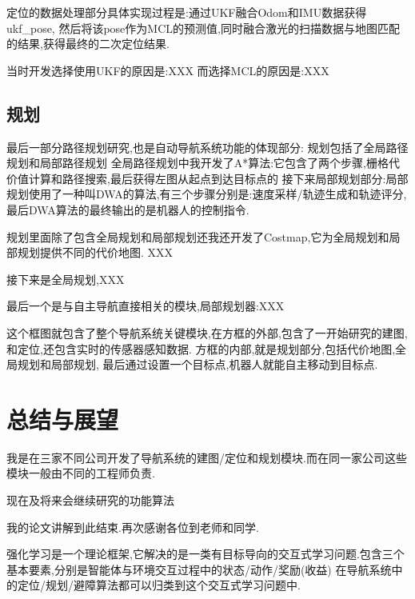 定位的数据处理部分具体实现过程是:通过UKF融合Odom和IMU数据获得ukf\_pose,
然后将该pose作为MCL的预测值,同时融合激光的扫描数据与地图匹配的结果,获得最终的二次定位结果.

当时开发选择使用UKF的原因是:XXX \qquad
而选择MCL的原因是:XXX

\subsection{规划}

最后一部分路径规划研究,也是自动导航系统功能的体现部分:
规划包括了全局路径规划和局部路径规划
全局路径规划中我开发了A*算法:它包含了两个步骤,栅格代价值计算和路径搜索,最后获得左图从起点到达目标点的
接下来局部规划部分:局部规划使用了一种叫DWA的算法,有三个步骤分别是:速度采样/轨迹生成和轨迹评分,最后DWA算法的最终输出的是机器人的控制指令.

规划里面除了包含全局规划和局部规划还我还开发了Costmap,它为全局规划和局部规划提供不同的代价地图.\qquad
XXX

接下来是全局规划,XXX

最后一个是与自主导航直接相关的模块,局部规划器:XXX

这个框图就包含了整个导航系统关键模块,在方框的外部,包含了一开始研究的建图,和定位,还包含实时的传感器感知数据.
方框的内部,就是规划部分,包括代价地图,全局规划和局部规划,
最后通过设置一个目标点,机器人就能自主移动到目标点.






\section{总结与展望}

我是在三家不同公司开发了导航系统的建图/定位和规划模块.而在同一家公司这些模块一般由不同的工程师负责.

现在及将来会继续研究的功能算法

我的论文讲解到此结束.再次感谢各位到老师和同学.

强化学习是一个理论框架,它解决的是一类有目标导向的交互式学习问题.包含三个基本要素,分别是智能体与环境交互过程中的状态/动作/奖励(收益)
在导航系统中的定位/规划/避障算法都可以归类到这个交互式学习问题中.
